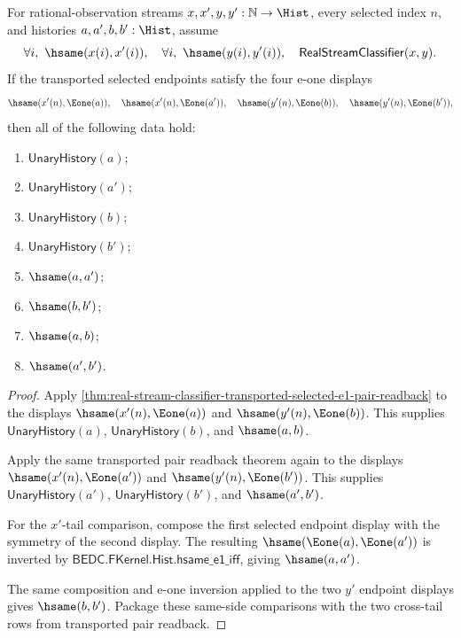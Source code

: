\begin{theorem}
\label{thm:real-stream-classifier-transported-selected-e1-tail-determinacy}
For rational-observation streams $x,x',y,y':\mathbb{N}\to\Hist$, every selected
index $n$, and histories $a,a',b,b':\Hist$, assume
$$
\forall i,\ \hsame(x(i),x'(i)),\quad
\forall i,\ \hsame(y(i),y'(i)),\quad
\mathsf{RealStreamClassifier}(x,y).
$$
If the transported selected endpoints satisfy the four e-one displays
$$
\hsame(x'(n),\Eone(a)),\quad
\hsame(x'(n),\Eone(a')),\quad
\hsame(y'(n),\Eone(b)),\quad
\hsame(y'(n),\Eone(b')),
$$
then all of the following data hold:
\begin{enumerate}
\item $\mathsf{UnaryHistory}(a)$;
\item $\mathsf{UnaryHistory}(a')$;
\item $\mathsf{UnaryHistory}(b)$;
\item $\mathsf{UnaryHistory}(b')$;
\item $\hsame(a,a')$;
\item $\hsame(b,b')$;
\item $\hsame(a,b)$;
\item $\hsame(a',b')$.
\end{enumerate}
\end{theorem}
\begin{proof}
Apply \autoref{thm:real-stream-classifier-transported-selected-e1-pair-readback}
to the displays $\hsame(x'(n),\Eone(a))$ and
$\hsame(y'(n),\Eone(b))$. This supplies $\mathsf{UnaryHistory}(a)$,
$\mathsf{UnaryHistory}(b)$, and $\hsame(a,b)$.

Apply the same transported pair readback theorem again to the displays
$\hsame(x'(n),\Eone(a'))$ and $\hsame(y'(n),\Eone(b'))$. This supplies
$\mathsf{UnaryHistory}(a')$, $\mathsf{UnaryHistory}(b')$, and
$\hsame(a',b')$.

For the $x'$-tail comparison, compose the first selected endpoint display with
the symmetry of the second display. The resulting
$\hsame(\Eone(a),\Eone(a'))$ is inverted by
$\mathsf{BEDC.FKernel.Hist.hsame\_e1\_iff}$, giving $\hsame(a,a')$.

The same composition and e-one inversion applied to the two $y'$ endpoint
displays gives $\hsame(b,b')$. Package these same-side comparisons with the two
cross-tail rows from transported pair readback.
\end{proof}

